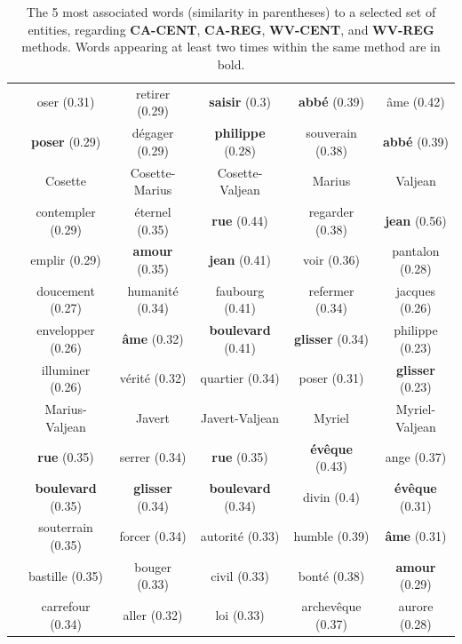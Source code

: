 \documentclass[
twocolumn,
]{ceurart}
\begin{document}
\begin{table}[!h]
\begin{tabular}{|c|c|c|c|c|c|}
		& oser (0.31) & retirer (0.29) & \textbf{saisir} (0.3) & \textbf{abbé} (0.39) & âme (0.42) \\
		& \textbf{poser} (0.29) & dégager (0.29) & \textbf{philippe} (0.28) & souverain (0.38) & \textbf{abbé} (0.39) \\
		\hline
		\hline
		\parbox[t]{2mm}{} & Cosette & Cosette-Marius & Cosette-Valjean & Marius & Valjean \\ 
		& contempler (0.29) & éternel (0.35) & \textbf{rue} (0.44) & regarder (0.38) & \textbf{jean} (0.56) \\
		& emplir (0.29) & \textbf{amour} (0.35) & \textbf{jean} (0.41) & voir (0.36) & pantalon (0.28) \\
		& doucement (0.27) & humanité (0.34) & faubourg (0.41) & refermer (0.34) & jacques (0.26) \\
		& envelopper (0.26) & \textbf{âme} (0.32) & \textbf{boulevard} (0.41) & \textbf{glisser} (0.34) & philippe (0.23) \\
		& illuminer (0.26) & vérité (0.32) & quartier (0.34) & poser (0.31) & \textbf{glisser} (0.23) \\ 
		& Marius-Valjean & Javert & Javert-Valjean & Myriel & Myriel-Valjean \\
		& \textbf{rue} (0.35) & serrer (0.34) & \textbf{rue} (0.35) & \textbf{évêque} (0.43) & ange (0.37) \\
		& \textbf{boulevard} (0.35) & \textbf{glisser} (0.34) & \textbf{boulevard} (0.34) & divin (0.4) & \textbf{évêque} (0.31) \\
		& souterrain (0.35) & forcer (0.34) & autorité (0.33) & humble (0.39) & \textbf{âme} (0.31) \\
		& bastille (0.35) & bouger (0.33) & civil (0.33) & bonté (0.38) & \textbf{amour} (0.29) \\
		& carrefour (0.34) & aller (0.32) & loi (0.33) & archevêque (0.37) & aurore (0.28) \\
		\hline
	\end{tabular}
	
	\label{word_vs_obj}
	\caption{The 5 most associated words (similarity in parentheses) to a selected set of entities, regarding \textbf{CA-CENT}, \textbf{CA-REG}, \textbf{WV-CENT}, and \textbf{WV-REG} methods. Words appearing at least two times within the same method are in bold.}
\end{table}
	
\end{document}
